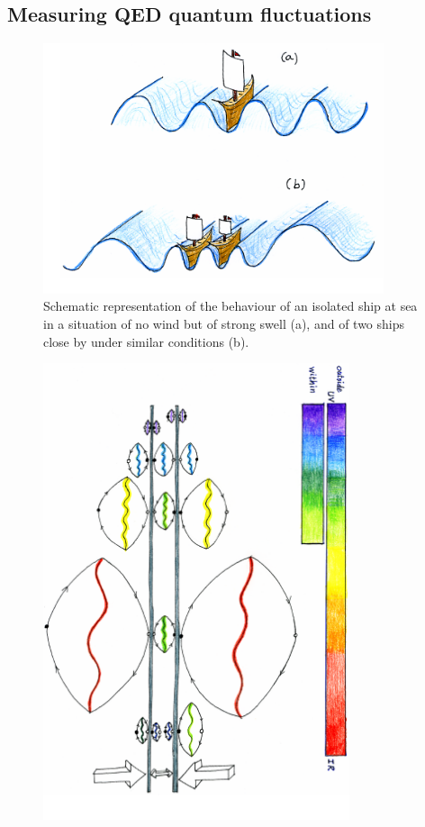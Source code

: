 \begin{subappendices}
\subsection{Measuring QED quantum fluctuations}
\begin{figure}
\centerline{\includegraphics[width=10cm]{C8/figsC8/fig6G2.pdf}}
\caption{Schematic representation of the behaviour of an isolated ship at sea in a situation of no wind but of
strong swell (a), and of two ships close by under similar conditions (b).}\label{fig6G2}
\end{figure}
\begin{figure}
\centerline{\includegraphics[width=9cm]{C8/figsC8/fig6G3.pdf}}

\end{figure}
\end{subappendices}
